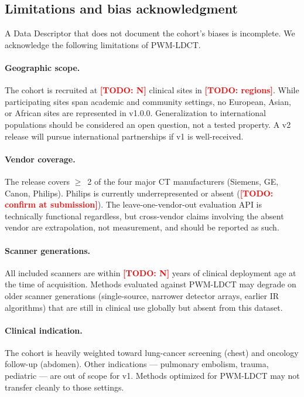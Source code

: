 \documentclass[twoside,11pt]{article}
\newcommand{\todo}[1]{\textcolor{red}{\textbf{[TODO: #1]}}}
\begin{document}
\subsection*{Limitations and bias acknowledgment}

A Data Descriptor that does not document the cohort's biases is incomplete. We acknowledge the following limitations of PWM-LDCT.

\paragraph{Geographic scope.} The cohort is recruited at \todo{N} clinical sites in \todo{regions}. While participating sites span academic and community settings, no European, Asian, or African sites are represented in v1.0.0. Generalization to international populations should be considered an open question, not a tested property. A v2 release will pursue international partnerships if v1 is well-received.

\paragraph{Vendor coverage.} The release covers $\geq$~2 of the four major CT manufacturers (Siemens, GE, Canon, Philips). Philips is currently underrepresented or absent (\todo{confirm at submission}). The leave-one-vendor-out evaluation API is technically functional regardless, but cross-vendor claims involving the absent vendor are extrapolation, not measurement, and should be reported as such.

\paragraph{Scanner generations.} All included scanners are within \todo{N} years of clinical deployment age at the time of acquisition. Methods evaluated against PWM-LDCT may degrade on older scanner generations (single-source, narrower detector arrays, earlier IR algorithms) that are still in clinical use globally but absent from this dataset.

\paragraph{Clinical indication.} The cohort is heavily weighted toward lung-cancer screening (chest) and oncology follow-up (abdomen). Other indications --- pulmonary embolism, trauma, pediatric --- are out of scope for v1. Methods optimized for PWM-LDCT may not transfer cleanly to those settings.
\end{document}
